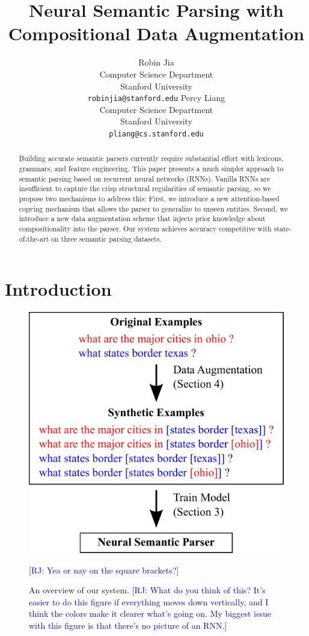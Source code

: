 \documentclass[11pt,letterpaper]{article}
\title{Neural Semantic Parsing with Compositional Data Augmentation}
\author{Robin Jia\\
	    Computer Science Department\\
      Stanford University\\
	    {\tt robinjia@stanford.edu}
	  \And
    Percy Liang\\
    Computer Science Department\\
  	Stanford University\\
  {\tt pliang@cs.stanford.edu}}
\date{}
\newcommand{\regex}{\textsc{Regex}\xspace}
\newcommand\rj[1]{\textcolor{blue}{[RJ: #1]}}
\begin{document}
\maketitle

\begin{abstract}
Building accurate semantic parsers currently require substantial effort
with lexicons, grammars, and feature engineering.
This paper presents a much simpler approach to semantic parsing based on
recurrent neural networks (RNNs).
Vanilla RNNs are insufficient to capture the crisp structural regularities of
semantic parsing,
so we propose two mechanisms to address this:
First, we introduce a new attention-based copying mechanism that
allows the parser to generalize to unseen entities.
Second, we introduce a new data augmentation scheme
that injects prior knowledge about compositionality into the parser.
Our system achieves accuracy competitive with state-of-the-art
on three semantic parsing datasets.
\end{abstract}

\section{Introduction}
\begin{figure}[t] 
\small
\begin{center} 
  \includegraphics[scale=0.35]{fig-overview.pdf}
\end{center} 
\caption{An overview of our system.
  \rj{What do you think of this?  It's easier to do this figure
    if everything moves down vertically, and I think the colors
  make it clearer what's going on.
My biggest issue with this figure is that there's no picture of an RNN.}
}
\rj{Yea or nay on the square brackets?}
\label{fig:overview}
\end{figure}
\end{document}
